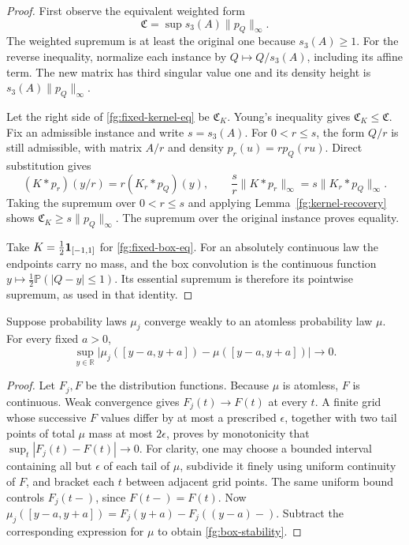 \begin{proof}
First observe the equivalent weighted form
\[
 \mathfrak C=\sup s_3(A)\|p_Q\|_\infty .
\]
The weighted supremum is at least the original one because
$s_3(A)\geq1$.  For the reverse inequality, normalize each
instance by $Q\mapsto Q/s_3(A)$, including its affine term.
The new matrix has third singular value one and its density
height is $s_3(A)\|p_Q\|_\infty$.

Let the right side of \eqref{fg:fixed-kernel-eq} be
$\mathfrak C_K$.  Young's inequality gives
$\mathfrak C_K\leq\mathfrak C$.
Fix an admissible instance and write $s=s_3(A)$.
For $0<r\leq s$, the form $Q/r$ is still admissible,
with matrix $A/r$ and density $p_r(u)=r p_Q(ru)$.
Direct substitution gives
\[
 (K*p_r)(y/r)=r(K_r*p_Q)(y),
 \qquad
 \frac{s}{r}\|K*p_r\|_\infty
     =s\|K_r*p_Q\|_\infty .
\]
Taking the supremum over $0<r\leq s$ and applying
Lemma~\ref{fg:kernel-recovery} shows
$\mathfrak C_K\geq s\|p_Q\|_\infty$.
The supremum over the original instance proves equality.

Take $K=\frac12{\bf1}_{[-1,1]}$ for
\eqref{fg:fixed-box-eq}.  For an absolutely continuous
law the endpoints carry no mass, and the box convolution
is the continuous function
$y\mapsto\frac12\mathbb P(|Q-y|\leq1)$.
Its essential supremum is therefore its pointwise
supremum, as used in that identity.
\end{proof}

\begin{lemma}
\label{fg:fixed-box-stability}
Suppose probability laws $\mu_j$ converge weakly to an
atomless probability law $\mu$.  For every fixed $a>0$,
\begin{equation}\label{fg:box-stability}
 \sup_{y\in\mathbb R}
 \bigl|\mu_j([y-a,y+a])-\mu([y-a,y+a])\bigr|
 \longrightarrow0.
\end{equation}
\end{lemma}
\begin{proof}
Let $F_j,F$ be the distribution functions.
Because $\mu$ is atomless, $F$ is continuous.
Weak convergence gives $F_j(t)\to F(t)$ at every $t$.
A finite grid whose successive $F$ values differ by at
most a prescribed $\epsilon$, together with two tail
points of total $\mu$ mass at most $2\epsilon$, proves by
monotonicity that $\sup_t|F_j(t)-F(t)|\to0$.
For clarity, one may choose a bounded interval containing
all but $\epsilon$ of each tail of $\mu$, subdivide it
finely using uniform continuity of $F$, and bracket each
$t$ between adjacent grid points.
The same uniform bound controls $F_j(t-)$, since
$F(t-)=F(t)$.
Now
$\mu_j([y-a,y+a])=F_j(y+a)-F_j((y-a)-)$.
Subtract the corresponding expression for $\mu$ to obtain
\eqref{fg:box-stability}.
\end{proof}

